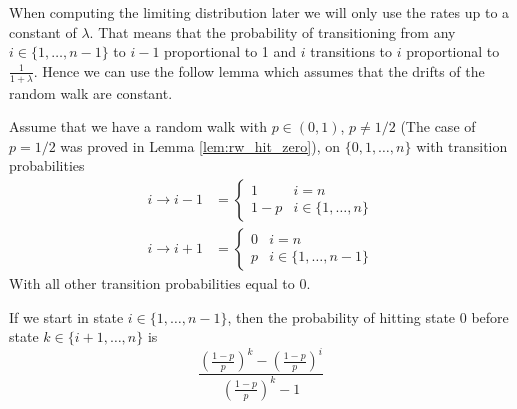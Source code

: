 \begin{remark}
When computing the limiting distribution later we will only use the rates up to a constant of $\lambda$.
That means that the probability of transitioning from any $i \in \{1,\ldots,n - 1\}$ to $i - 1$ proportional to 1 and $i$ transitions to $i$ proportional to $\frac{1}{1 + \lambda}$.
Hence we can use the follow lemma which assumes that the drifts of the random walk are constant.
\end{remark}

\begin{lemma}\label{lem:rw_p_hit_zero}
Assume that we have a random walk with $p \in (0, 1)$, $p \not = 1/2$ (The case of $p = 1/2$ was proved in Lemma \ref{lem:rw_hit_zero}), on $\{0,1,\ldots, n\}$ with transition probabilities
\begin{align*}
    i \to i - 1 &= \begin{cases}
        1 & i = n\\
        1 - p & i \in \{1,\ldots, n\}
    \end{cases}\\
    i \to i + 1 &= \begin{cases}
        0 & i = n\\
        p & i \in \{1,\ldots, n-1\}
    \end{cases}
\end{align*}
With all other transition probabilities equal to 0.

If we start in state $i \in \{1,\ldots, n - 1\}$, then the probability of hitting state 0 before state $k \in \{i + 1, \ldots, n\}$ is
$$
\frac{
        \left( \frac{1 - p}{p} \right)^{k} - \left( \frac{1 - p}{p} \right)^{i}
    }{
         \left( \frac{1 - p}{p} \right)^{k} - 1
    }
$$
\end{lemma}

